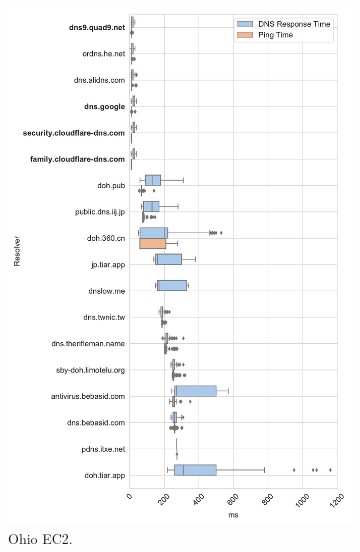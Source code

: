 \begin{figure}[h!]
\begin{subfigure}[b]{0.4\textwidth}
\includegraphics[width=\textwidth]{figures/ohio_asia.pdf}
\caption{Ohio EC2.}
\end{subfigure}
%
\hfill \\
\begin{subfigure}[b]{0.4\textwidth}

\end{subfigure}
\end{figure}
